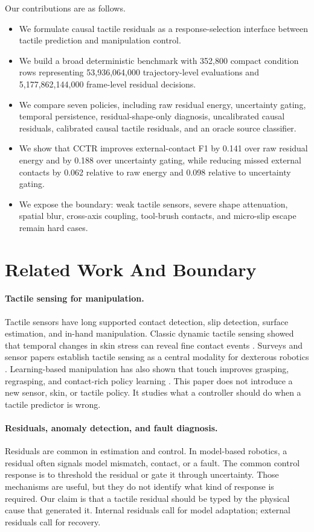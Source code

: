 \documentclass{article}
\newcommand{\method}{CCTR}
\newcommand{\trajN}{53{,}936{,}064{,}000}
\newcommand{\frameN}{5{,}177{,}862{,}144{,}000}
\newcommand{\rowN}{352{,}800}
\begin{document}
Our contributions are as follows.
\begin{itemize}
\item We formulate causal tactile residuals as a response-selection interface between tactile prediction and manipulation control.
\item We build a broad deterministic benchmark with \rowN{} compact condition rows representing \trajN{} trajectory-level evaluations and \frameN{} frame-level residual decisions.
\item We compare seven policies, including raw residual energy, uncertainty gating, temporal persistence, residual-shape-only diagnosis, uncalibrated causal residuals, calibrated causal tactile residuals, and an oracle source classifier.
\item We show that \method{} improves external-contact F1 by 0.141 over raw residual energy and by 0.188 over uncertainty gating, while reducing missed external contacts by 0.062 relative to raw energy and 0.098 relative to uncertainty gating.
\item We expose the boundary: weak tactile sensors, severe shape attenuation, spatial blur, cross-axis coupling, tool-brush contacts, and micro-slip escape remain hard cases.
\end{itemize}

\section{Related Work And Boundary}

\paragraph{Tactile sensing for manipulation.}
Tactile sensors have long supported contact detection, slip detection, surface estimation, and in-hand manipulation. Classic dynamic tactile sensing showed that temporal changes in skin stress can reveal fine contact events \citep{howe1993dynamic}. Surveys and sensor papers establish tactile sensing as a central modality for dexterous robotics \citep{dahiya2010tactile, lambeta2020digit}. Learning-based manipulation has also shown that touch improves grasping, regrasping, and contact-rich policy learning \citep{calandra2018more, sodhi2021learning}. This paper does not introduce a new sensor, skin, or tactile policy. It studies what a controller should do when a tactile predictor is wrong.

\paragraph{Residuals, anomaly detection, and fault diagnosis.}
Residuals are common in estimation and control. In model-based robotics, a residual often signals model mismatch, contact, or a fault. The common control response is to threshold the residual or gate it through uncertainty. Those mechanisms are useful, but they do not identify what kind of response is required. Our claim is that a tactile residual should be typed by the physical cause that generated it. Internal residuals call for model adaptation; external residuals call for recovery.
\end{document}
